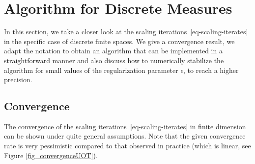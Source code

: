 \section{Algorithm for Discrete Measures}
\label{sec-algorithm}

In this section, we take a closer look at the scaling iterations~\eqref{eq-scaling-iterates} in the specific case of discrete finite spaces. We give a convergence result, we adapt the notation to obtain an algorithm that can be implemented in a straightforward manner and also discuss how to numerically stabilize the algorithm for small values of the regularization parameter $\epsilon$, to reach a higher precision.

\subsection{Convergence}
The convergence of the scaling iterations~\eqref{eq-scaling-iterates} in finite dimension can be shown under quite general assumptions. Note that the given convergence rate is very pessimistic compared to that observed in practice (which is linear, see Figure \ref{fig_convergenceUOT}).

